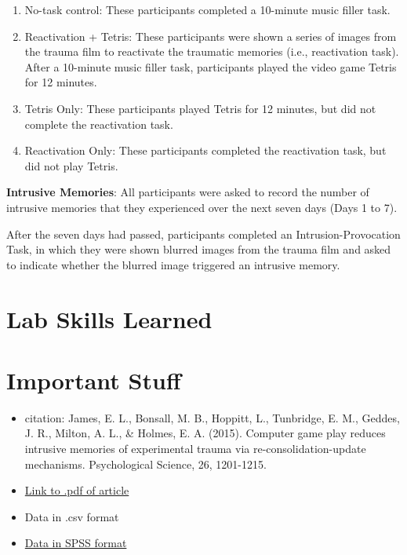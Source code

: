 \documentclass[
]{book}
\providecommand{\tightlist}{%
  \setlength{\itemsep}{0pt}\setlength{\parskip}{0pt}}
\begin{document}
\begin{enumerate}
\def\labelenumi{\arabic{enumi}.}
\tightlist
\item
  No-task control: These participants completed a 10-minute music filler task.
\item
  Reactivation + Tetris: These participants were shown a series of images from the trauma film to reactivate the traumatic memories (i.e., reactivation task). After a 10-minute music filler task, participants played the video game Tetris for 12 minutes.
\item
  Tetris Only: These participants played Tetris for 12 minutes, but did not complete the reactivation task.
\item
  Reactivation Only: These participants completed the reactivation task, but did not play Tetris.
\end{enumerate}

\textbf{Intrusive Memories}: All participants were asked to record the number of intrusive memories that they experienced over the next seven days (Days 1 to 7).

After the seven days had passed, participants completed an Intrusion-Provocation Task, in which they were shown blurred images from the trauma film and asked to indicate whether the blurred image triggered an intrusive memory.

\hypertarget{lab-skills-learned-2}{%
\section{Lab Skills Learned}\label{lab-skills-learned-2}}

\hypertarget{important-stuff-2}{%
\section{Important Stuff}\label{important-stuff-2}}

\begin{itemize}
\tightlist
\item
  citation: James, E. L., Bonsall, M. B., Hoppitt, L., Tunbridge, E. M., Geddes, J. R., Milton, A. L., \& Holmes, E. A. (2015). Computer game play reduces intrusive memories of experimental trauma via re-consolidation-update mechanisms. Psychological Science, 26, 1201-1215.
\item
  \href{http://journals.sagepub.com/stoken/default+domain/hQ2W4fbPrZVJ7eyNJaqu/full}{Link to .pdf of article}
\item
  Data in .csv format
\item
  \href{https://drive.google.com/file/d/0Bz-rhZ21ShvOZ1lvQ0dQekZGWU0/view?usp=sharing}{Data in SPSS format}
\end{itemize}
\end{document}
